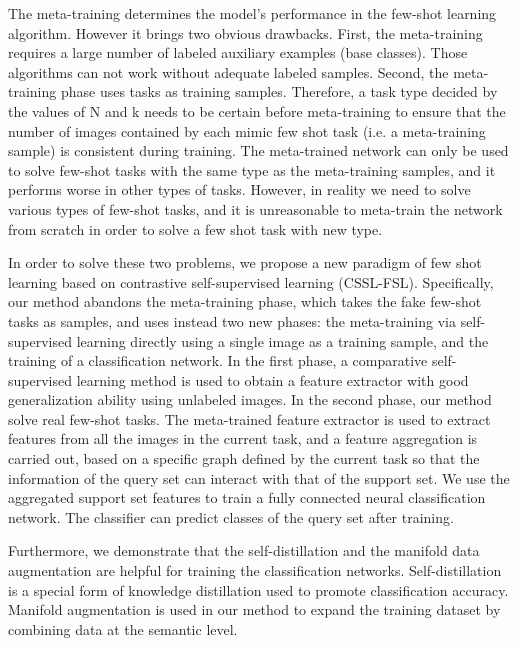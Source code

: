 \documentclass[conference]{IEEEtran}
\begin{document}
The meta-training determines the model’s performance in the few-shot learning algorithm. However it brings two obvious drawbacks. First, the meta-training requires a large number of labeled auxiliary examples (base classes). Those algorithms can not work without adequate labeled samples. Second, the meta-training phase uses tasks as training samples. Therefore, a task type decided by the values of N and k needs to be certain before meta-training to ensure that the number of images contained by each mimic few shot task (i.e. a meta-training sample) is consistent during training. The meta-trained network can only be used to solve few-shot tasks with the same type as the meta-training samples, and it performs worse in other types of tasks. However, in reality we need to solve various types of few-shot tasks, and it is unreasonable to meta-train the network from scratch in order to solve a few shot task with new type.


In order to solve these two problems, we propose a new paradigm of few shot learning based on contrastive self-supervised learning (CSSL-FSL). Specifically, our method abandons the meta-training phase, which takes the fake few-shot tasks as samples, and uses instead two new phases: the meta-training via self-supervised learning directly using a single image as a training sample, and the training of a classification network. In the first phase, a comparative self-supervised learning method is used to obtain a feature extractor with good generalization ability using unlabeled images. In the second phase, our method solve real few-shot tasks. The meta-trained feature extractor is used to extract features from all the images in the current task, and a feature aggregation is carried out, based on a specific graph defined by the current task so that the information of the query set can interact with that of the support set. We use the aggregated support set features to train a fully connected neural classification network. The classifier can predict classes of the query set after training.


Furthermore, we demonstrate that the self-distillation\cite{tian2020rethinking} and the manifold data augmentation are helpful for training the classification networks. Self-distillation is a special form of knowledge distillation used to promote classification accuracy. Manifold augmentation is used in our method to expand the training dataset by combining data at the semantic level.
\end{document}
